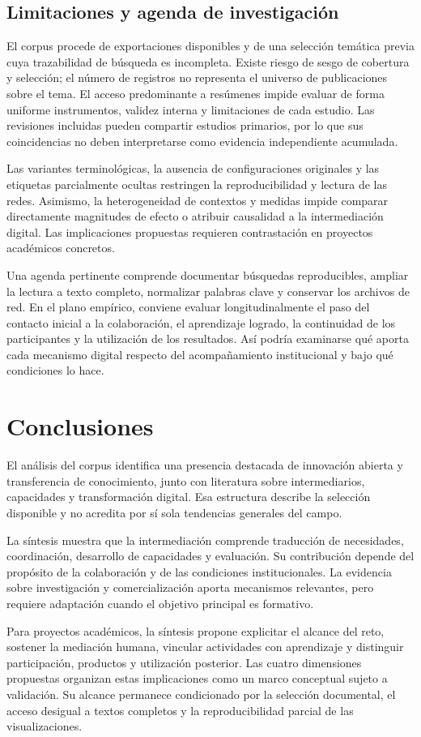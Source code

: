 \documentclass[12pt,twocolumn]{article}
\begin{document}
\subsection{Limitaciones y agenda de investigación}
El corpus procede de exportaciones disponibles y de una selección temática previa cuya trazabilidad de búsqueda es incompleta. Existe riesgo de sesgo de cobertura y selección; el número de registros no representa el universo de publicaciones sobre el tema. El acceso predominante a resúmenes impide evaluar de forma uniforme instrumentos, validez interna y limitaciones de cada estudio. Las revisiones incluidas pueden compartir estudios primarios, por lo que sus coincidencias no deben interpretarse como evidencia independiente acumulada.

Las variantes terminológicas, la ausencia de configuraciones originales y las etiquetas parcialmente ocultas restringen la reproducibilidad y lectura de las redes. Asimismo, la heterogeneidad de contextos y medidas impide comparar directamente magnitudes de efecto o atribuir causalidad a la intermediación digital. Las implicaciones propuestas requieren contrastación en proyectos académicos concretos.

Una agenda pertinente comprende documentar búsquedas reproducibles, ampliar la lectura a texto completo, normalizar palabras clave y conservar los archivos de red. En el plano empírico, conviene evaluar longitudinalmente el paso del contacto inicial a la colaboración, el aprendizaje logrado, la continuidad de los participantes y la utilización de los resultados. Así podría examinarse qué aporta cada mecanismo digital respecto del acompañamiento institucional y bajo qué condiciones lo hace.

\section{Conclusiones}
El análisis del corpus identifica una presencia destacada de innovación abierta y transferencia de conocimiento, junto con literatura sobre intermediarios, capacidades y transformación digital. Esa estructura describe la selección disponible y no acredita por sí sola tendencias generales del campo.

La síntesis muestra que la intermediación comprende traducción de necesidades, coordinación, desarrollo de capacidades y evaluación. Su contribución depende del propósito de la colaboración y de las condiciones institucionales. La evidencia sobre investigación y comercialización aporta mecanismos relevantes, pero requiere adaptación cuando el objetivo principal es formativo.

Para proyectos académicos, la síntesis propone explicitar el alcance del reto, sostener la mediación humana, vincular actividades con aprendizaje y distinguir participación, productos y utilización posterior. Las cuatro dimensiones propuestas organizan estas implicaciones como un marco conceptual sujeto a validación. Su alcance permanece condicionado por la selección documental, el acceso desigual a textos completos y la reproducibilidad parcial de las visualizaciones.

\begingroup
\raggedright


\endgroup
\end{document}
